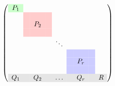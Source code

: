 \begin{frame}
\begin{columns}
\begin{column}{0.5\textwidth}
        \[
            \left(\begin{array}{cccccccccc}
            \gcell P_1    &        &            &       &        &       &            &        & \\
                            & \rcell & \rcell     & \rcell&        &       &            &        & \\
                            & \rcell & \rcell P_2 & \rcell&        &       &            &        & \\
                            & \rcell & \rcell     & \rcell&        &       &            &        & \\
                            &        &            &       & \ddots &       &            &        & \\
                            &        &            &       &        &\bcell &   \bcell   & \bcell & \\
                            &        &            &       &        &\bcell & \bcell P_r & \bcell & \\
                            &        &            &       &        &\bcell &   \bcell   & \bcell & \\
                \rowcolor{gray!20}
                Q_1       &        &   Q_2      &       & \ldots &       &    Q_r     &        & R\\
            \end{array}\right)
        \]
        \end{column}

    \end{columns}
 \end{frame}
